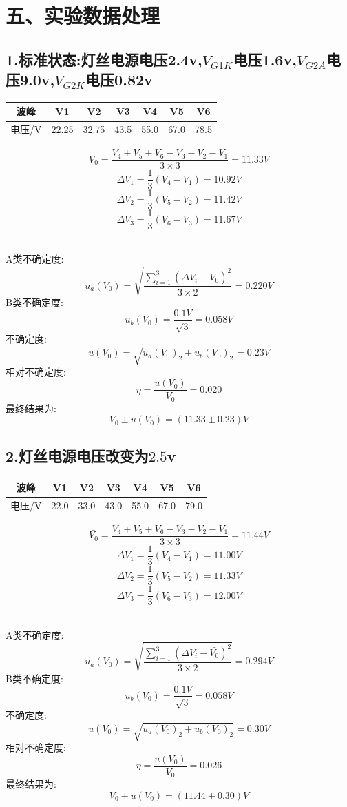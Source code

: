 \documentclass[11pt,a4paper,oneside]{article}
\begin{document}
\section*{五、实验数据处理}
\subsection*{1.标准状态:灯丝电源电压2.4v,$V_{G1K}$电压1.6v,$V_{G2A}$电压9.0v,$V_{G2K}$电压0.82v}
\begin{center}
\begin{tabular}{|c|c|c|c|c|c|c|}
	\hline
	波峰&V1&V2&V3&V4&V5&V6
	\\\hline
	电压/V&22.25&32.75&43.5&55.0&67.0&78.5\\\hline
	\end{tabular}
	\end{center}

$$  \bar{V_0}=\frac{V_4+V_5+V_6-V_3-V_2-V_1}{3\times 3}=11.33V $$
$$	\Delta V_1=\frac{1}{3}(V_4-V_1)=10.92V $$
$$	\Delta V_2=\frac{1}{3}(V_5-V_2)=11.42V $$
$$	\Delta V_3=\frac{1}{3}(V_6-V_3)=11.67V $$ 

\ \\
A类不确定度:
$$	u_a(V_0)=\sqrt{\frac{\sum\limits_{i=1}^{3} (\Delta V_i-\bar{V_0})^2}{3\times 2}}=0.220V $$
B类不确定度:
$$	u_b(V_0)=\frac{0.1V}{\sqrt{3}}=0.058V $$
不确定度:
$$	u(V_0)=\sqrt{u_a(V_0)_2+u_b(V_0)_2}=0.23V $$
相对不确定度:
$$	\eta=\frac{u(V_0)}{V_0}=0.020 $$
最终结果为:
$$	V_0 \pm u(V_0) = (11.33 \pm 0.23)V $$


\subsection*{2.灯丝电源电压改变为$2.5$v}
\begin{center}
\begin{tabular}{|c|c|c|c|c|c|c|}
	\hline
	波峰&V1&V2&V3&V4&V5&V6
	\\\hline
	电压/V&22.0&33.0&43.0&55.0&67.0&79.0\\\hline
	\end{tabular}
	\end{center}

$$  \bar{V_0}=\frac{V_4+V_5+V_6-V_3-V_2-V_1}{3\times 3}=11.44V $$
$$	\Delta V_1=\frac{1}{3}(V_4-V_1)=11.00V $$
$$	\Delta V_2=\frac{1}{3}(V_5-V_2)=11.33V $$
$$	\Delta V_3=\frac{1}{3}(V_6-V_3)=12.00V $$ 

\ \\
A类不确定度:
$$	u_a(V_0)=\sqrt{\frac{\sum\limits_{i=1}^{3} (\Delta V_i-\bar{V_0})^2}{3\times 2}}=0.294V $$
B类不确定度:
$$	u_b(V_0)=\frac{0.1V}{\sqrt{3}}=0.058V $$
不确定度:
$$	u(V_0)=\sqrt{u_a(V_0)_2+u_b(V_0)_2}=0.30V $$
相对不确定度:
$$	\eta=\frac{u(V_0)}{V_0}=0.026 $$
最终结果为:
$$	V_0 \pm u(V_0) = (11.44 \pm 0.30)V $$
\end{document}
